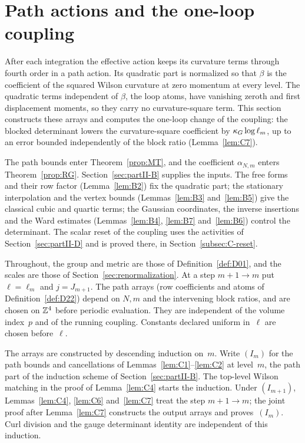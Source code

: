 \section{Path actions and the one-loop coupling}\label{sec:partII-C}

After each integration the effective action keeps its curvature terms through fourth order in a path action. Its quadratic part is normalized so that $\beta$ is the coefficient of the squared Wilson curvature at zero momentum at every level. The quadratic terms independent of $\beta$, the loop atoms, have vanishing zeroth and first displacement moments, so they carry no curvature-square term. This section constructs these arrays and computes the one-loop change of the coupling: the blocked determinant lowers the curvature-square coefficient by $\kappa_G\log\ell_m$, up to an error bounded independently of the block ratio (Lemma~\ref{lem:C7}).

The path bounds enter Theorem~\ref{prop:MT}, and the coefficient $\alpha_{N,m}$ enters Theorem~\ref{prop:RG}. Section~\ref{sec:partII-B} supplies the inputs. The free forms and their row factor (Lemma~\ref{lem:B2}) fix the quadratic part; the stationary interpolation and the vertex bounds (Lemmas~\ref{lem:B3} and~\ref{lem:B5}) give the classical cubic and quartic terms; the Gaussian coordinates, the inverse insertions and the Ward estimates (Lemmas~\ref{lem:B4}, \ref{lem:B7} and~\ref{lem:B6}) control the determinant. The scalar reset of the coupling uses the activities of Section~\ref{sec:partII-D} and is proved there, in Section~\ref{subsec:C-reset}.

Throughout, the group and metric are those of Definition~\ref{def:D01}, and the scales are those of Section~\ref{sec:renormalization}. At a step $m+1\to m$ put $\ell=\ell_m$ and $j=J_{m+1}$. The path arrays (row coefficients and atoms of Definition~\ref{def:D22}) depend on $N,m$ and the intervening block ratios, and are chosen on $\mathbb{Z}^4$ before periodic evaluation. They are independent of the volume index~$p$ and of the running coupling. Constants declared uniform in~$\ell$ are chosen before~$\ell$.

The arrays are constructed by descending induction on~$m$. Write $(I_m)$ for the path bounds and cancellations of Lemmas~\ref{lem:C1}--\ref{lem:C2} at level~$m$, the path part of the induction scheme of Section~\ref{sec:partII-B}. The top-level Wilson matching in the proof of Lemma~\ref{lem:C4} starts the induction. Under $(I_{m+1})$, Lemmas~\ref{lem:C4}, \ref{lem:C6} and~\ref{lem:C7} treat the step $m+1\to m$; the joint proof after Lemma~\ref{lem:C7} constructs the output arrays and proves~$(I_m)$. Curl division and the gauge determinant identity are independent of this induction.

